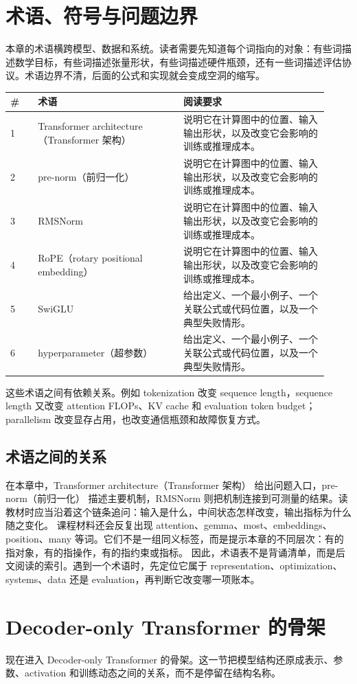\documentclass[a4paper]{article}
\begin{document}
\section{术语、符号与问题边界}
本章的术语横跨模型、数据和系统。读者需要先知道每个词指向的对象：有些词描述数学目标，有些词描述张量形状，有些词描述硬件瓶颈，还有一些词描述评估协议。术语边界不清，后面的公式和实现就会变成空洞的缩写。
\begin{longtable}{p{0.08\linewidth}p{0.42\linewidth}p{0.42\linewidth}}
\toprule
\textbf{\#} & \textbf{术语} & \textbf{阅读要求}\\
\midrule
1 & Transformer architecture（Transformer 架构） & 说明它在计算图中的位置、输入输出形状，以及改变它会影响的训练或推理成本。\\
2 & pre-norm（前归一化） & 说明它在计算图中的位置、输入输出形状，以及改变它会影响的训练或推理成本。\\
3 & RMSNorm & 说明它在计算图中的位置、输入输出形状，以及改变它会影响的训练或推理成本。\\
4 & RoPE（rotary positional embedding） & 说明它在计算图中的位置、输入输出形状，以及改变它会影响的训练或推理成本。\\
5 & SwiGLU & 给出定义、一个最小例子、一个关联公式或代码位置，以及一个典型失败情形。\\
6 & hyperparameter（超参数） & 给出定义、一个最小例子、一个关联公式或代码位置，以及一个典型失败情形。\\
\bottomrule
\end{longtable}
这些术语之间有依赖关系。例如 tokenization 改变 sequence length，sequence length 又改变 attention FLOPs、KV cache 和 evaluation token budget；parallelism 改变显存占用，也改变通信瓶颈和故障恢复方式。
\subsection{术语之间的关系}
在本章中，Transformer architecture（Transformer 架构） 给出问题入口，pre-norm（前归一化） 描述主要机制，RMSNorm 则把机制连接到可测量的结果。读教材时应当沿着这个链条追问：输入是什么，中间状态怎样改变，输出指标为什么随之变化。
课程材料还会反复出现 attention、gemma、most、embeddings、position、many 等词。它们不是一组同义标签，而是提示本章的不同层次：有的指对象，有的指操作，有的指约束或指标。
因此，术语表不是背诵清单，而是后文阅读的索引。遇到一个术语时，先定位它属于 representation、optimization、systems、data 还是 evaluation，再判断它改变哪一项账本。
\section{Decoder-only Transformer 的骨架}
现在进入 Decoder-only Transformer 的骨架。这一节把模型结构还原成表示、参数、activation 和训练动态之间的关系，而不是停留在结构名称。
\end{document}
